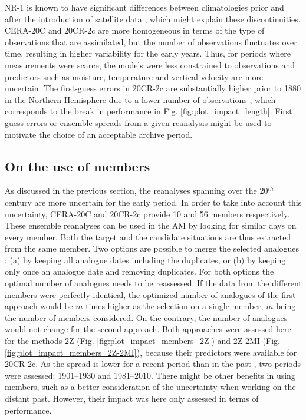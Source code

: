 \documentclass{ametsoc}
\begin{document}
NR-1 is known to have significant differences between climatologies prior and after the introduction of satellite data \citep{Kistler2001}, which might explain these discontinuities. CERA-20C and 20CR-2c are more homogeneous in terms of the type of observations that are assimilated, but the number of observations fluctuates over time, resulting in higher variability for the early years. Thus, for periods where measurements were scarce, the models were less constrained to observations and predictors such as moisture, temperature and vertical velocity are more uncertain. The first-guess errors in 20CR-2c are substantially higher prior to 1880 in the Northern Hemisphere due to a lower number of observations \citep{Compo2011}, which corresponds to the break in performance in Fig. \ref{fig:plot_impact_length}. First guess errors or ensemble spreads from a given reanalysis might be used to motivate the choice of an acceptable archive period.


\subsection{On the use of members}
\label{sec:ensemble}

As discussed in the previous section, the reanalyses spanning over the 20$^{th}$ century are more uncertain for the early period. In order to take into account this uncertainty, CERA-20C and 20CR-2c provide 10 and 56 members respectively. These ensemble reanalyses can be used in the AM by looking for similar days on every member. Both the target and the candidate situations are thus extracted from the same member. Two options are possible to merge the selected analogues : (a) by keeping all analogue dates including the duplicates, or (b) by keeping only once an analogue date and removing duplicates. For both options the optimal number of analogues needs to be reassessed. If the data from the different members were perfectly identical, the optimized number of analogues of the first approach would be $m$ times higher as the selection on a single member, $m$ being the number of members considered. On the contrary, the number of analogues would not change for the second approach. Both approaches were assessed here for the methods 2Z (Fig. \ref{fig:plot_impact_members_2Z}) and 2Z-2MI (Fig. \ref{fig:plot_impact_members_2Z-2MI}), because their predictors were available for 20CR-2c. As the spread is lower for a recent period than in the past \citep{Compo2011}, two periods were assessed: 1901--1930 and 1981--2010. There might be other benefits in using members, such as a better consideration of the uncertainty when working on the distant past. However, their impact was here only assessed in terms of performance.
\end{document}
